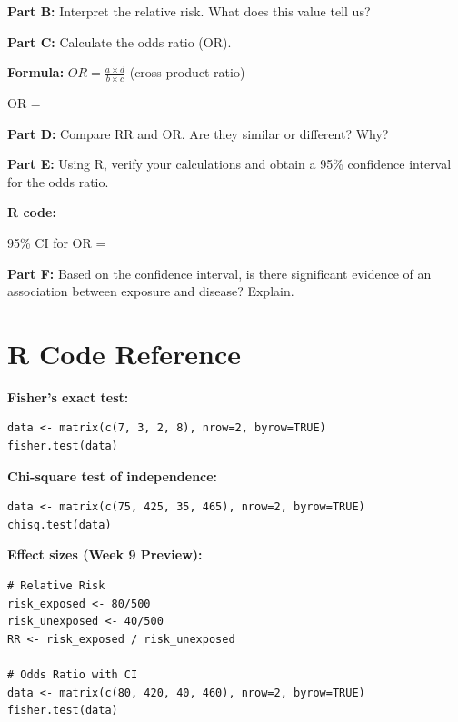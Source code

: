 \documentclass[11pt]{article}
\begin{document}
\vspace{1.5cm}

\textbf{Part B:} Interpret the relative risk. What does this value tell us?

\vspace{2.5cm}

\textbf{Part C:} Calculate the odds ratio (OR).

\vspace{0.3cm}

\textbf{Formula:} $OR = \frac{a \times d}{b \times c}$ (cross-product ratio)

\vspace{0.3cm}

OR =

\vspace{2.5cm}

\textbf{Part D:} Compare RR and OR. Are they similar or different? Why?

\vspace{2.5cm}

\textbf{Part E:} Using R, verify your calculations and obtain a 95\% confidence interval for the odds ratio.

\vspace{0.3cm}

\textbf{R code:}

\vspace{2cm}

95\% CI for OR =

\vspace{1cm}

\textbf{Part F:} Based on the confidence interval, is there significant evidence of an association between exposure and disease? Explain.

\vspace{2.5cm}

\newpage

\section*{R Code Reference}

\textbf{Fisher's exact test:}
\begin{verbatim}
data <- matrix(c(7, 3, 2, 8), nrow=2, byrow=TRUE)
fisher.test(data)
\end{verbatim}

\textbf{Chi-square test of independence:}
\begin{verbatim}
data <- matrix(c(75, 425, 35, 465), nrow=2, byrow=TRUE)
chisq.test(data)
\end{verbatim}

\textbf{Effect sizes (Week 9 Preview):}
\begin{verbatim}
# Relative Risk
risk_exposed <- 80/500
risk_unexposed <- 40/500
RR <- risk_exposed / risk_unexposed

# Odds Ratio with CI
data <- matrix(c(80, 420, 40, 460), nrow=2, byrow=TRUE)
fisher.test(data)
\end{verbatim}
\end{document}
